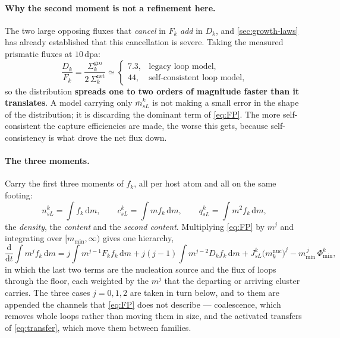 \documentclass{article}
\begin{document}
\paragraph{Why the second moment is not a refinement here.} The two large
opposing fluxes that \emph{cancel} in $F_k$ \emph{add} in $D_k$, and
\cref{sec:growth-laws} has already established that this cancellation is severe.
Taking the measured
prismatic fluxes at $10\,$dpa:
\begin{equation}
  \frac{D_k}{F_k}
  =\frac{\Sigma^{\mathrm{gro}}_k}{2\,\Sigma^{\mathrm{net}}_k}
  \simeq
  \begin{cases}
    7.3, & \text{legacy loop model},\\
    44,  & \text{self-consistent loop model},
  \end{cases}
  \label{eq:DoverF}
\end{equation}
so the distribution \textbf{spreads one to two orders of magnitude faster than it
translates}. A model carrying only $\bar m^k_{sL}$ is not making a small error in
the shape of the distribution; it is discarding the dominant term of
\cref{eq:FP}. The more self-consistent the capture efficiencies are made, the
worse this gets, because self-consistency is what drove the net flux down.

\paragraph{The three moments.} Carry the first three moments of $f_k$, all per
host atom and all on the same footing:
\begin{equation}
  n^k_{sL}=\!\int\! f_k\,\mathrm dm,
  \qquad
  c^k_{sL}=\!\int\! m f_k\,\mathrm dm,
  \qquad
  q^k_{sL}=\!\int\! m^2 f_k\,\mathrm dm,
  \label{eq:moments}
\end{equation}
the \emph{density}, the \emph{content} and the \emph{second content}.
Multiplying \cref{eq:FP} by $m^{j}$ and integrating over $[m_{\min},\infty)$
gives one hierarchy,
\begin{equation}
  \frac{\mathrm d}{\mathrm dt}\!\int\! m^{j}f_k\,\mathrm dm
  =j\!\int\! m^{j-1}F_kf_k\,\mathrm dm
   +j(j-1)\!\int\! m^{j-2}D_kf_k\,\mathrm dm
   +J^k_{sL}\bigl(m^{\mathrm{nuc}}_k\bigr)^{j}
   -m_{\min}^{\,j}\,\Phi^k_{\min},
  \label{eq:hierarchy}
\end{equation}
in which the last two terms are the nucleation source and the flux of loops
through the floor, each weighted by the $m^{j}$ that the departing or arriving
cluster carries. The three cases $j=0,1,2$ are taken in turn below, and to them
are appended the channels that \cref{eq:FP} does not describe --- coalescence,
which removes whole loops rather than moving them in size, and the activated
transfers of \cref{eq:transfer}, which move them between families.
\end{document}
